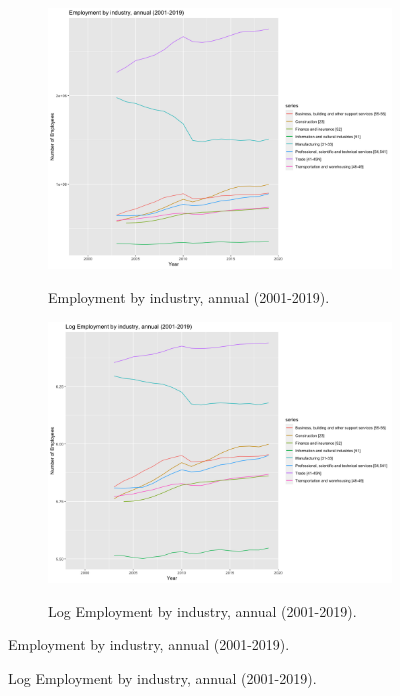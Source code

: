 \documentclass[12pt]{article}
\begin{document}
\begin{figure}[h!]
\centering
\begin{subfigure}{.5\textwidth}
  \centering
\includegraphics[scale=0.25]{employment.png}
\label{}
\caption{Employment by industry, annual (2001-2019).}
\end{subfigure}%
\begin{subfigure}{.5\textwidth}
  \centering
\includegraphics[scale=0.25]{log_employment.png}
\label{}
\caption{Log Employment by industry, annual (2001-2019).}
\end{subfigure}
\captionsetup{textformat=empty,labelformat=blank}
\caption{Employment by industry, annual (2001-2019).}
\caption{Log Employment by industry, annual (2001-2019).}
\end{figure}
\end{document}

